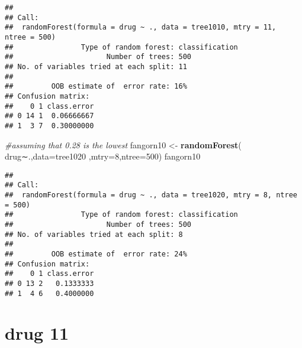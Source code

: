 \documentclass[]{article}
\newenvironment{Shaded}{\begin{snugshade}}{\end{snugshade}}
\newcommand{\KeywordTok}[1]{\textcolor[rgb]{0.13,0.29,0.53}{\textbf{#1}}}
\newcommand{\DataTypeTok}[1]{\textcolor[rgb]{0.13,0.29,0.53}{#1}}
\newcommand{\DecValTok}[1]{\textcolor[rgb]{0.00,0.00,0.81}{#1}}
\newcommand{\StringTok}[1]{\textcolor[rgb]{0.31,0.60,0.02}{#1}}
\newcommand{\CommentTok}[1]{\textcolor[rgb]{0.56,0.35,0.01}{\textit{#1}}}
\newcommand{\OperatorTok}[1]{\textcolor[rgb]{0.81,0.36,0.00}{\textbf{#1}}}
\newcommand{\NormalTok}[1]{#1}
\begin{document}
\begin{verbatim}
## 
## Call:
##  randomForest(formula = drug ~ ., data = tree1010, mtry = 11,      ntree = 500) 
##                Type of random forest: classification
##                      Number of trees: 500
## No. of variables tried at each split: 11
## 
##         OOB estimate of  error rate: 16%
## Confusion matrix:
##    0 1 class.error
## 0 14 1  0.06666667
## 1  3 7  0.30000000
\end{verbatim}

\begin{Shaded}
\begin{Highlighting}[]
\CommentTok{#assuming that 0.28 is the lowest}
\NormalTok{fangorn10 <-}\StringTok{ }\KeywordTok{randomForest}\NormalTok{( drug∼.,}\DataTypeTok{data=}\NormalTok{tree1020  ,}\DataTypeTok{mtry=}\DecValTok{8}\NormalTok{,}\DataTypeTok{ntree=}\DecValTok{500}\NormalTok{)}
\NormalTok{fangorn10}
\end{Highlighting}
\end{Shaded}

\begin{verbatim}
## 
## Call:
##  randomForest(formula = drug ~ ., data = tree1020, mtry = 8, ntree = 500) 
##                Type of random forest: classification
##                      Number of trees: 500
## No. of variables tried at each split: 8
## 
##         OOB estimate of  error rate: 24%
## Confusion matrix:
##    0 1 class.error
## 0 13 2   0.1333333
## 1  4 6   0.4000000
\end{verbatim}

\section{drug 11}\label{drug-11}

\begin{Shaded}
\end{Shaded}
\end{document}
